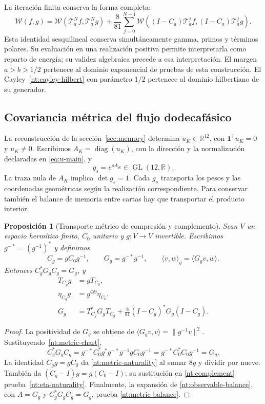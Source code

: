 \documentclass[a4paper,10pt]{article}
\newtheorem{proposition}[theorem]{Proposición}
\theoremstyle{definition}\newtheorem{definition}[theorem]{Definición}
\theoremstyle{remark}\newtheorem{remark}[theorem]{Observación}
\numberwithin{equation}{section}
\begin{document}
La iteración finita conserva la forma completa:
\[
 \mathscr W(f,g)
 =\mathscr W(\mathcal T_a^Nf,\mathcal T_a^Ng)
 +\frac8{81}\sum_{j=0}^{N-1}
 \mathscr W((I-C_a)\mathcal T_a^jf,
            (I-C_a)\mathcal T_a^jg).
\]
Esta identidad sesquilineal conserva simultáneamente
gamma, primos y términos polares. Su evaluación en una
realización positiva permite interpretarla como reparto
de energía; su validez algebraica precede a esa
interpretación. El margen \(a>b>1/2\) pertenece al
dominio exponencial de pruebas de esta construcción.
El Cayley~\eqref{nt:cayley-hilbert} con parámetro \(1/2\)
pertenece al dominio hilbertiano de su generador.

\subsection{Covariancia métrica del flujo dodecafásico}

La reconstrucción de la sección~\ref{sec:memory} determina
\(u_K\in\mathbb R^{12}\), con
\(\mathbf1^{\mathsf T}u_K=0\) y \(u_K\ne0\).
Escribimos \(A_K=\operatorname{diag}(u_K)\), con la dirección y la
normalización declaradas en \eqref{eq:u-main}, y
\[
 g_s=e^{sA_K}\in\operatorname{GL}(12,\mathbb R).
\]
La traza nula de \(A_K\) implica \(\det g_s=1\).
Cada \(g_s\) transporta los pesos y las coordenadas
geométricas según la realización correspondiente.
Para conservar también el balance de memoria entre
cartas hay que transportar el producto interior.

\begin{proposition}[Transporte métrico de compresión y complemento]
Sean \(V\) un espacio hermítico finito, \(C_0\) unitario
y \(g:V\to V\) invertible. Escribimos
\(g^{-*}=(g^{-1})^*\) y definimos
\begin{equation}
 C_g=gC_0g^{-1},\qquad
 G_g=g^{-*}g^{-1},\qquad
 \langle v,w\rangle_g=\langle G_gv,w\rangle.
 \label{nt:metric-chart}
\end{equation}
Entonces \(C_g^*G_gC_g=G_g\), y
\begin{align}
 T_{C_g}g&=gT_{C_0},\label{nt:metric-naturality}\\
 \eta_{C_g}g&=g^{\oplus9}\eta_{C_0},\label{nt:eta-naturality}\\
 G_g&=T_{C_g}^*G_gT_{C_g}
 +\frac8{81}(I-C_g)^*G_g(I-C_g).\label{nt:metric-balance}
\end{align}
\end{proposition}

\begin{proof}
La positividad de \(G_g\) se obtiene de
\(\langle G_gv,v\rangle=\|g^{-1}v\|^2\).
Sustituyendo~\eqref{nt:metric-chart},
\[
 C_g^*G_gC_g
 =g^{-*}C_0^*g^*g^{-*}g^{-1}gC_0g^{-1}
 =g^{-*}C_0^*C_0g^{-1}=G_g.
\]
La identidad \(C_gg=gC_0\) da
\eqref{nt:metric-naturality} al sumar \(8g\) y dividir
por nueve. También da
\((C_g-I)g=g(C_0-I)\); su sustitución en
\eqref{nt:complement} prueba~\eqref{nt:eta-naturality}.
Finalmente, la expansión de
\eqref{nt:observable-balance}, con \(A=G_g\) y
\(C_g^*G_gC_g=G_g\), prueba
\eqref{nt:metric-balance}.
\end{proof}
\end{document}
